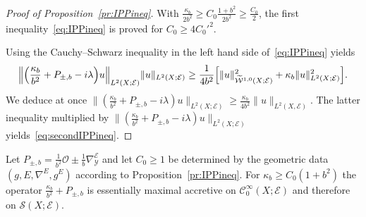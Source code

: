 \documentclass[10pt]{amsart}
\theoremstyle{definition}\newtheorem{defi}[theo]{Definition}\newtheorem{rema}[theo]{Remark}\newtheorem{exam}[theo]{Example}\newtheorem{exem}[theo]{Example}\newtheorem{nota}[theo]{Notation}
\newcommand{\clW}{\mathcal{W}}
\newcommand{\clC}{\mathcal{C}}
\newcommand{\clY}{\mathcal{Y}}
\newcommand{\clO}{\mathcal{O}}
\newcommand{\clE}{\mathcal{E}}
\newcommand{\clS}{\mathcal{S}}
\let\originalleft\left
\let\originalright\right
\renewcommand{\left}{\mathopen{}\mathclose\bgroup\originalleft}
\renewcommand{\right}{\aftergroup\egroup\originalright}
\begin{document}
\begin{proof}[Proof of Proposition~\ref{pr:IPPineq}]
With $\frac{\kappa_{b}}{2b^{2}}\geq C_{0}\frac{1+b^{2}}{2b^{2}}\geq \frac{C_{0}}{2}$, the first inequality~\eqref{eq:IPPineq} is proved for $C_{0}\geq 4{C_{0}'}^{2}$.

Using the Cauchy--Schwarz inequality in the left hand side of~\eqref{eq:IPPineq} yields
\[
\left\|\left(\frac{\kappa_{b}}{b^{2}}+P_{\pm, b} - i\lambda\right) u \right\|_{L^{2}(X;\clE)} \|u\|_{L^{2}(X;\clE)} \geq \frac{1}{4b^{2}}
\left[
\|u\|_{\widetilde{\clW}^{1,0}(X;\clE)}^{2} + \kappa_{b} \|u\|_{L^{2}(X;\clE)}^2
\right].
\]
We deduce at once $ \|(\frac{\kappa_{b}}{b^{2}}+P_{\pm, b} - i \lambda) u \|_{L^{2}(X;\clE)} \geq \frac{\kappa_{b}}{4b^{2}}\|u\|_{L^{2}(X,\clE)} $. The latter inequality multiplied by $\|(\frac{\kappa_{b}}{b^{2}}+P_{\pm, b} - i \lambda) u \|_{L^{2}(X;\clE)}$ yields~\eqref{eq:secondIPPineq}.
\end{proof}

\begin{coro}\label{corollary_ess_max_acc}
Let $P_{\pm, b}=\frac{1}{b^{2}}\clO\pm \frac{1}{b}\nabla^{\clE}_{\clY}$ and let $C_{0}\geq 1$ be determined by the geometric data $(g,E,\nabla^{E},g^{E})$ according to Proposition~\ref{pr:IPPineq}. For $\kappa_{b}\geq C_{0}(1+b^{2})$ the operator $\frac{\kappa_{b}}{b^{2}}+P_{\pm,b}$ is essentially maximal accretive on $\clC^{\infty}_{0}(X;\clE)$ and therefore on $\clS(X;\clE)$.
\end{coro}
\end{document}
